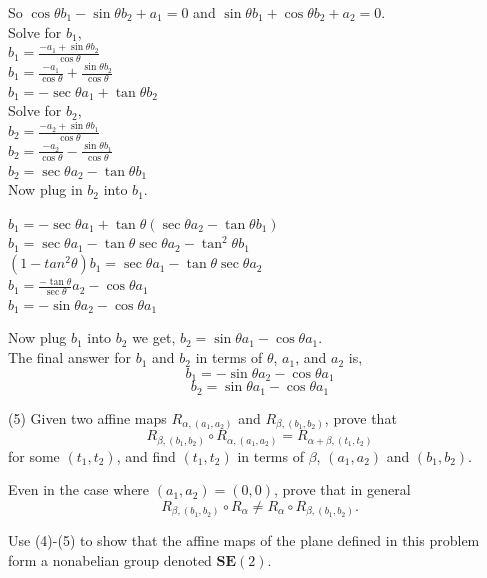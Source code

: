 \documentclass[12pt]{article}
\begin{document}
So $\cos\theta b_1 - \sin \theta b_2 + a_1 = 0$ and $\sin\theta b_1 + \cos\theta b_2 + a_2 = 0$. \\

Solve for $b_1$, \\
$b_1 = \frac{- a_1 +  \sin \theta b_2}{\cos\theta}$ \\
$b_1 = \frac{- a_1}{\cos\theta} + \frac{\sin \theta b_2}{\cos\theta}$ \\
$b_1 = -\sec\theta a_1 + \tan\theta b_2$ \\

Solve for $b_2$, \\
$b_2 = \frac{- a_2 +  \sin \theta b_1}{\cos\theta}$  \\
$b_2 = \frac{- a_2}{\cos\theta} - \frac{\sin \theta b_1}{\cos\theta}$ \\
$b_2 = \sec\theta a_2 - \tan\theta b_1$ \\

Now plug in $b_2$ into $b_1$.

$b_1 = -\sec\theta a_1 + \tan\theta (\sec\theta a_2 - \tan\theta b_1)$ \\
$b_1 = \sec\theta a_1 - \tan\theta \sec\theta a_2 - \tan^2\theta b_1$ \\
$(1-tan^2\theta)b_1 = \sec\theta a_1 - \tan\theta \sec\theta a_2 $ \\
$b_1 = \frac{-\tan \theta}{\sec \theta}a_2 - \cos \theta a_1$ \\
$b_1 = - \sin \theta a_2 - \cos \theta a_1$ 

Now plug $b_1$ into $b_2$ we get, 
$b_2 = \sin \theta a_1 - \cos \theta a_1$. \\

The final answer for $b_1$ and $b_2$ in terms of $\theta$, $a_1$, and $a_2$ is, 
$$b_1 = -\sin \theta a_2 - \cos \theta a_1$$
$$b_2 = \sin \theta a_1 - \cos \theta a_1$$

\medskip
(5)
Given two affine maps $R_{\alpha, (a_1,a_2)}$ and
$R_{\beta, (b_1,b_2)}$, prove that
\[
R_{\beta, (b_1,b_2)} \circ R_{\alpha, (a_1,a_2)} =
R_{\alpha + \beta, (t_1,t_2)}
\]
for some $(t_1, t_2)$, and find $(t_1, t_2)$ in terms of
$\beta$, $(a_1,a_2)$ and $(b_1,b_2)$.


\medskip
Even in the case where $(a_1,a_2) = (0, 0)$, prove that in general
\[
R_{\beta, (b_1,b_2)} \circ R_{\alpha} \not=
R_{\alpha}  \circ R_{\beta, (b_1,b_2)}. 
\]

Use (4)-(5) to show that the affine maps of the plane defined in this
problem form a nonabelian group denoted $\mathbf{SE}(2)$.
\end{document}
